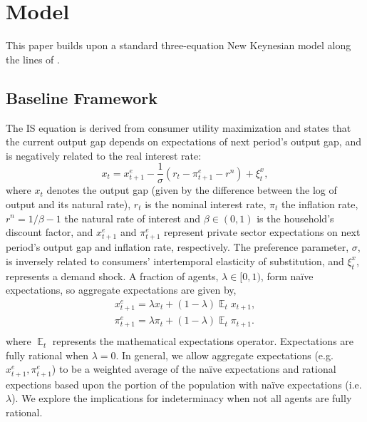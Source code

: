 \documentclass[english,authoryear,12pt]{elsarticle}
\DeclareMathOperator{\E}{\mathbb{E}}
\begin{document}
\section{\label{Model}Model}
This paper builds upon a standard three-equation New Keynesian model along the lines of \cite{clarida1999}.

\subsection{Baseline Framework}

The IS equation is derived from consumer utility maximization and states that the current output gap depends on expectations of next period's output gap, and is negatively related to the real interest rate:
\begin{equation}\label{eq:ISe}
	x_t = x_{t+1}^e - \frac{1}{\sigma} \left( r_t - \pi_{t+1}^e  - r^n  \right) + \xi_t^{x},
\end{equation}
where $x_t$ denotes the output gap (given by the difference between the log of output and its natural rate), $r_t$ is the nominal interest rate, $\pi_t$ the inflation rate, $r^n = 1/\beta - 1$ the natural rate of interest and $\beta \in (0,1)$ is the household's discount factor, and $x_{t+1}^e$ and $\pi_{t+1}^e$ represent private sector expectations on next period's output gap and inflation rate, respectively. The preference parameter, $\sigma$, is inversely related to consumers' intertemporal elasticity of substitution, and $\xi_t^x$, represents a demand shock. A fraction of agents, $\lambda\in[0,1)$, form na\"ive expectations, so aggregate expectations are given by,
\begin{equation}
	\begin{array}{c}
		x_{t+1}^e = \lambda x_t + (1-\lambda) \E_t x_{t+1}, \\ [1.5pc]
		\pi_{t+1}^e = \lambda \pi_t + (1-\lambda) \E_t \pi_{t+1}. \\
	\end{array}
\end{equation}
where $\E_t$ represents the mathematical expectations operator. Expectations are fully rational when $\lambda=0$. In general, we allow aggregate expectations (e.g. $x_{t+1}^e,\pi_{t+1}^e$) to be a  weighted average of the na\"ive expectations and rational expections based upon the portion of the population with na\"ive expectations (i.e. $\lambda$). We explore the implications for indeterminacy when not all agents are fully rational.
\end{document}
